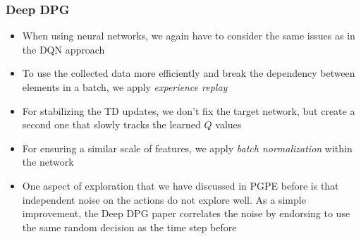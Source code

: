 \subsubsection{Deep DPG}
\begin{itemize}
	\item When using neural networks, we again have to consider the same issues as in the DQN approach
	\item To use the collected data more efficiently and break the dependency between elements in a batch, we apply \textit{experience replay}
	\item For stabilizing the TD updates, we don't fix the target network, but create a second one that slowly tracks the learned $Q$ values
	\item For ensuring a similar scale of features, we apply \textit{batch normalization} within the network
	\item One aspect of exploration that we have discussed in PGPE before is that independent noise on the actions do not explore well. As a simple improvement, the Deep DPG paper correlates the noise by endorsing to use the same random decision as the time step before
\end{itemize}
